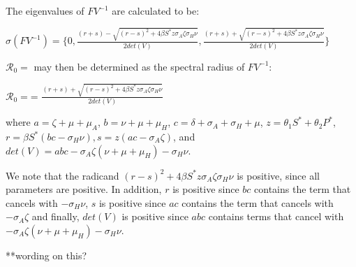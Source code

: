 \documentclass[12pt]{article}
\begin{document}
The eigenvalues of $FV^{-1}$ are calculated to be: 
\begin{center}
$\sigma (FV^{-1}) = \{0, \frac{(r+s)-\sqrt{(r-s)^2+4\beta S^* z  \sigma_A \zeta \sigma_H \nu}}{2det(V)} 
, \frac{(r+s)+\sqrt{(r-s)^2+4\beta S^* z  \sigma_A \zeta \sigma_H \nu}}{2det(V)} 
\}$
\end{center}

$\mathscr{R}_0=$ may then be determined as the spectral radius of $FV^{-1}$:
\begin{center}
$\mathscr{R}_0=$= $\frac{(r+s)+\sqrt{(r-s)^2+4\beta S^* z  \sigma_A \zeta \sigma_H \nu}}{2det(V)} $
\end{center}
where $a=\zeta +\mu + \mu_A$, $b=\nu + \mu + \mu_H$, $c=\delta + \sigma_A + \sigma_H +\mu$, $z=\theta_1 S^* + \theta_2 P^*$, $ r=\beta S^* (bc-\sigma_H \nu), s=z(ac-\sigma_{A} \zeta)$, and $det(V)=abc-\sigma_A\zeta(\nu+\mu+\mu_H)-\sigma_H\nu$.

We note that the radicand $(r-s)^2+4\beta S^* z  \sigma_A \zeta \sigma_H \nu$ is positive, since all parameters are positive. In addition, $r$ is positive since $bc$ contains the term that cancels with $-\sigma_{H} \nu$,  $s$ is positive since $ac$ contains the term that cancels with $-\sigma_{A} \zeta$ and finally, $det(V)$ is positive since $abc$ contains terms that cancel with $-\sigma_A\zeta(\nu+\mu+\mu_H)-\sigma_H\nu$. 

**wording on this? 





 
\end{document}
